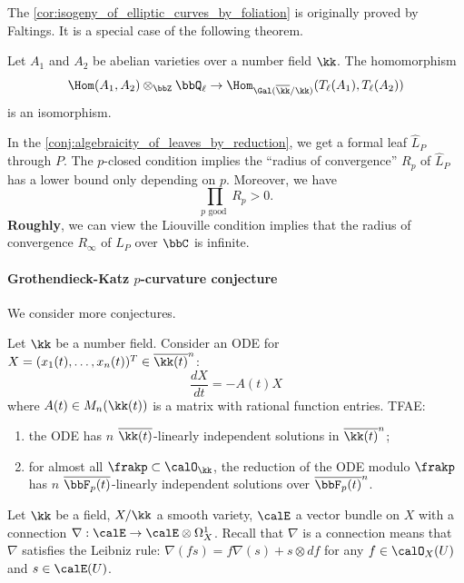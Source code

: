   \begin{remark}
    The \cref{cor:isogeny_of_elliptic_curves_by_foliation} is originally proved by Faltings.
    It is a special case of the following theorem.
  \end{remark}

  \begin{theorem}
    Let $A_1$ and $A_2$ be abelian varieties over a number field $\kk$.
    The homomorphism
    \[ \Hom(A_1, A_2) \otimes_\bbZ \bbQ_\ell \to \Hom_{\Gal(\overline{\kk}/\kk)}(T_\ell(A_1), T_\ell(A_2)) \]
    is an isomorphism.
  \end{theorem}

  \begin{remark}
    In the \cref{conj:algebraicity_of_leaves_by_reduction}, we get a formal leaf $\hat{L}_P$ through $P$.
    The $p$-closed condition implies the ``radius of convergence'' $R_p$ of $\hat{L}_P$ has a lower bound only depending on $p$.
    Moreover, we have 
    \[ \prod_{p \text{ good }} R_p > 0. \]
    \textbf{Roughly}, we can view the Liouville condition implies that the radius of convergence $R_\infty$ of $\hat{L}_P$ over $\bbC$ is infinite.
  \end{remark}

  \paragraph{Grothendieck-Katz $p$-curvature conjecture}

  We consider more conjectures.

  \begin{conjecture}[Grothendieck]\label{conj:ODE_reduction}
    Let $\kk$ be a number field.
    Consider an ODE for $X = (x_1(t), \dots, x_n(t))^T \in \overline{\kk(t)}^n$:
    \[ \frac{d X}{d t} = - A(t) X \]
    where $A(t) \in M_n(\kk(t))$ is a matrix with rational function entries. 
    TFAE:
    \begin{enumerate}
      \item the ODE has $n$ $\overline{\kk(t)}$-linearly independent solutions in $\overline{\kk(t)}^n$;
      \item for almost all $\frakp \subset \calO_\kk$, the reduction of the ODE modulo $\frakp$ has $n$ $\overline{\bbF_p(t)}$-linearly independent solutions over $\overline{\bbF_p(t)}^n$.
    \end{enumerate}
  \end{conjecture}

  Let $\kk$ be a  field, $X/\kk$ a smooth variety, $\calE$ a vector bundle on $X$ with a connection $\nabla: \calE \to \calE \otimes \Omega^1_X$.
  Recall that $\nabla$ is a connection means that $\nabla$ satisfies the Leibniz rule: $\nabla(f s) = f \nabla(s) + s \otimes df$ for any $f \in \calO_X(U)$ and $s \in \calE(U)$.

